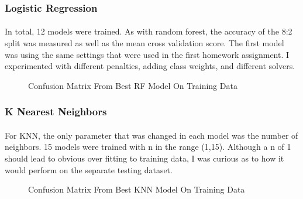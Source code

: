 \documentclass{article}
\begin{document}
\subsubsection{Logistic Regression}
\paragraph{}
    In total, 12 models were trained. As with random forest, the accuracy of the 8:2 split was measured as well as the mean cross validation score. The first model was using the same settings that were used in the first homework assignment. I experimented with different penalties, adding class weights, and different solvers.
    
    \begin{figure}[H]
      \centering
      \caption{Confusion Matrix From Best RF Model On Training Data}
    \end{figure}
\subsubsection{K Nearest Neighbors}
\paragraph{}
    For KNN, the only parameter that was changed in each model was the number of neighbors. 15 models were trained with n in the range (1,15). Although a n of 1 should lead to obvious over fitting to training data, I was curious as to how it would perform on the separate testing dataset.

    \begin{figure}[H]
      \centering
      \caption{Confusion Matrix From Best KNN Model On Training Data}
    \end{figure}
\end{document}

